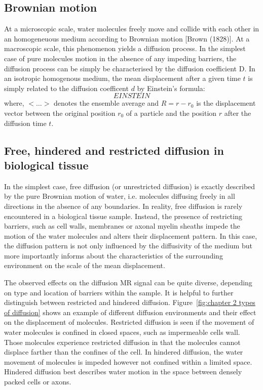 \subsection{Brownian motion}
At a microscopic scale, water molecules freely move and collide with each other in an homogeneuous medium according to Brownian motion [Brown (1828)]. At a macroscopic scale, this phenomenon yields a diffusion process. In the simplest case of pure molecules motion in the absence of any impeding barriers, the diffusion process can be simply be characterised by the diffusion coefficient D\citep{Fick}. In an isotropic homogenous medium,  the mean displacement after a given time $t$ is simply related to the diffusion coefficent $d$ by Einstein's formula: 
\begin{equation}
	EINSTEIN
\end{equation}
where, $<\dots>$ denotes the ensemble average and $R = r - r_0$ is the displacement vector between the original position $r_0$ of a particle and the position $r$ after the diffusion time $t$. 

\subsection[Types of diffusion]{Free, hindered and restricted diffusion in biological tissue}
In the simplest case, free diffusion (or unrestricted diffusion) is exactly described by the pure Brownian motion of water, i.e. molecules diffusing freely in all directions in the absence of any boundaries. In reality, free diffusion is rarely encountered in a biological tissue sample. Instead, the presence of restricting barriers, such as cell walls, membranes or axonal myelin sheaths impede the motion of the water molecules and alters their displacement pattern. In this case, the diffusion pattern is not only influenced by the diffusivity of the medium but more importantly informs about the characteristics of the surrounding environment on the scale of the mean displacement. 

The observed effects on the diffusion MR signal can be quite diverse, depending on type and location of barriers within the sample. It is helpful to further distinguish between restricted and hindered diffusion. Figure~\ref{fig:chapter 2 types of diffusion} shows an example of different diffusion environments and their effect on the displacement of molecules. Restricted diffusion is seen if the movement of water molecules is confined in closed spaces, such as impermeable cells wall. Those molecules experience restricted diffusion in that the molecules cannot displace farther than the confines of the cell. In hindered diffusion, the water movement of molecules is impeded however not confined within a limited space. Hindered diffusion best describes water motion in the space between densely packed cells or axons. 


